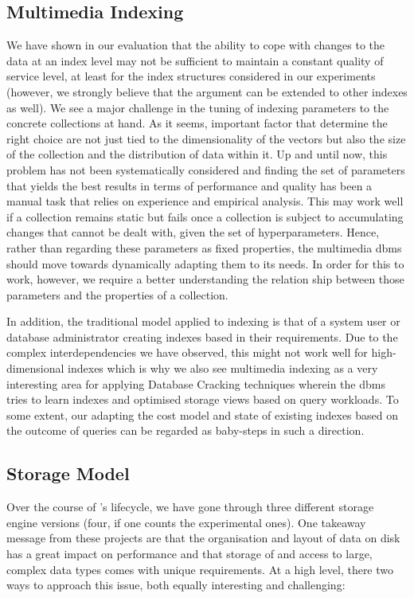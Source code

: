 \subsection{Multimedia Indexing}

We have shown in our evaluation that the ability to cope with changes to the data at an index level may not be sufficient to maintain a constant quality of service level, at least for the index structures considered in our experiments (however, we strongly believe that the argument can be extended to other indexes as well). We see a major challenge in the tuning of indexing parameters to the concrete collections at hand. As it seems, important factor that determine the right choice are not just tied to the dimensionality of the vectors but also the size of the collection and the distribution of data within it. Up and until now, this problem has not been systematically considered and finding the set of parameters that yields the best results in terms of performance and quality has been a manual task that relies on experience and empirical analysis. This may work well if a collection remains static but fails once a collection is subject to accumulating changes that cannot be dealt with, given the set of hyperparameters. Hence, rather than regarding these parameters as fixed properties, the multimedia \acrshort{dbms} should move towards dynamically adapting them to its needs. In order for this to work, however, we require a better understanding the relation ship between those parameters and the properties of a collection.

In addition, the traditional model applied to indexing is that of a system user or database administrator creating indexes based in their requirements. Due to the complex interdependencies we have observed, this might not work well for high-dimensional indexes which is why we also see multimedia indexing as a very interesting area for applying Database Cracking techniques \cite{Idreos:2007Database,Schuhknecht:2013Uncracked} wherein the \acrshort{dbms} tries to learn indexes and optimised storage views based on query workloads. To some extent, our adapting the cost model and state of existing indexes based on the outcome of queries can be regarded as baby-steps in such a direction.

\subsection{Storage Model}
Over the course of \cottontail{}'s lifecycle, we have gone through three different storage engine versions (four, if one counts the experimental ones). One takeaway message from these projects are that the organisation and layout of data on disk has a great impact on performance and that storage of and access to large, complex data types comes with unique requirements. At a high level, there two ways to approach this issue, both equally interesting and challenging:

